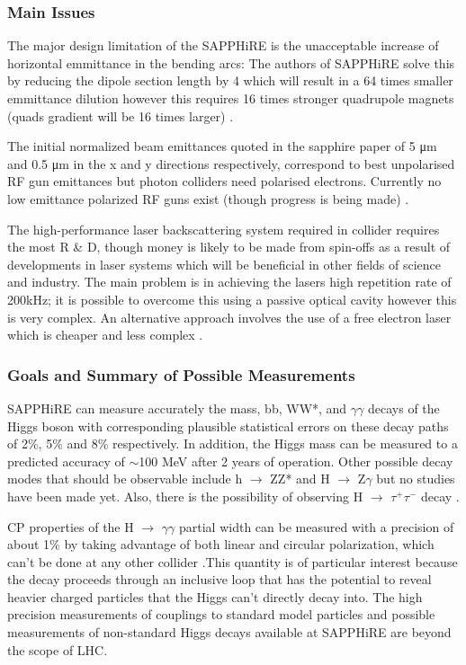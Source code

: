 \subsubsection{Main Issues}
The major design limitation of the SAPPHiRE is the unacceptable increase of horizontal emmittance in the bending arcs: The authors of SAPPHiRE solve this by reducing the dipole section length by 4 which will result in a 64 times smaller emmittance dilution however this requires 16 times stronger quadrupole magnets (quads gradient will be 16 times larger) \cite{Telnov:Photons}.

The initial normalized beam emittances quoted in the sapphire paper of 5 μm and 0.5 μm in the x and y directions respectively, correspond to best unpolarised RF gun emittances but photon colliders need polarised electrons. Currently no low emittance polarized RF guns exist (though progress is being made) \cite{Telnov:Photons:MIT}.

The high-performance laser backscattering system required in collider requires the most R \& D, though money is likely to be made from spin-offs as a result of developments in laser systems which will be beneficial in other fields of science and industry. The main problem is in achieving the lasers high repetition rate of 200kHz; it is possible to overcome this using a passive optical cavity however this is very complex. An alternative approach involves the use of a free electron laser which is cheaper and less complex \cite{Zimmermann:TLEP}.

\subsubsection{Goals and Summary of Possible Measurements}
SAPPHiRE can measure accurately the mass, bb, WW*, and $\gamma\gamma$ decays of the Higgs boson with corresponding plausible statistical errors on these decay paths of 2\%, 5\% and 8\% respectively. In addition, the Higgs mass can be measured to a predicted accuracy of $\sim$100 MeV after 2 years of operation. Other possible decay modes that should be observable include h $\rightarrow$ ZZ* and H $\rightarrow$ Z$\gamma$ but no studies have been made yet. Also, there is the possibility of observing H $\rightarrow$ $\tau^{+}\tau^{-}$ decay \cite{Bogacz:SAPPHiRE}.

CP properties of the H $\rightarrow$ $\gamma\gamma$ partial width can be measured with a precision of about 1\% by taking advantage of both linear and circular polarization, which can't be done at any other collider \cite{Chou:Higgs}.This quantity is of particular interest because the decay proceeds through an inclusive loop that has the potential to reveal heavier charged particles that the Higgs can't directly decay into. The high precision measurements of couplings to standard model particles and possible measurements of non-standard Higgs decays available at SAPPHiRE are beyond the scope of LHC.

